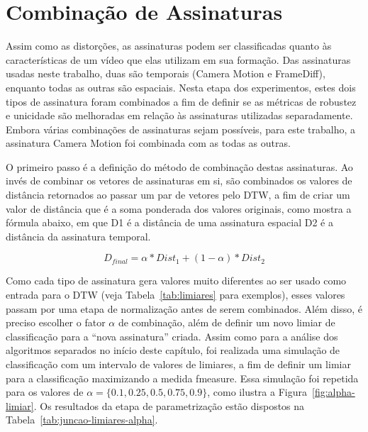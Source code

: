 \section{Combinação de Assinaturas}

Assim como as distorções, as assinaturas podem ser classificadas quanto às características de um vídeo que elas utilizam em sua formação. Das assinaturas usadas neste trabalho, duas são temporais (Camera Motion e FrameDiff), enquanto todas as outras são espaciais. Nesta etapa dos experimentos, estes dois tipos de assinatura foram combinados a fim de definir se as métricas de robustez e unicidade são melhoradas em relação às assinaturas utilizadas separadamente. Embora várias combinações de assinaturas sejam possíveis, para este trabalho, a assinatura Camera Motion foi combinada com as todas as outras. 

O primeiro passo é a definição do método de combinação destas assinaturas. Ao invés de combinar os vetores de assinaturas em si, são combinados os valores de distância retornados ao passar um par de vetores pelo DTW, a fim de criar um valor de distância que é a soma ponderada dos valores originais, como mostra a fórmula abaixo, em que D1 é a distância de uma assinatura espacial D2 é a distância da assinatura temporal.

$$
D_{final} = \alpha * Dist_{1} + (1-\alpha) * Dist_{2}
$$

Como cada tipo de assinatura gera valores muito diferentes ao ser usado como entrada para o DTW (veja Tabela~\ref{tab:limiares} para exemplos), esses valores passam por uma etapa de normalização antes de serem combinados. Além disso, é preciso escolher o fator $\alpha$ de combinação, além de definir um novo limiar de classificação para a ``nova assinatura'' criada. Assim como para a análise dos algoritmos separados no início deste capítulo, foi realizada uma simulação de classificação com um intervalo de valores de limiares, a fim de definir um limiar para a classificação maximizando a medida fmeasure. Essa simulação foi repetida para os valores de $\alpha = \{0.1, 0.25, 0.5, 0.75, 0.9\}$, como ilustra a Figura~\ref{fig:alpha-limiar}. Os resultados da etapa de parametrização estão dispostos na Tabela~\ref{tab:juncao-limiares-alpha}.

